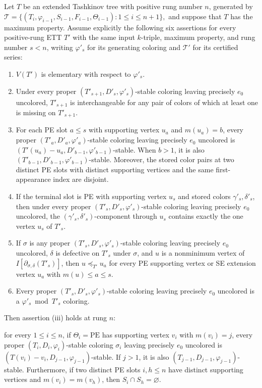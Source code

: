 \begin{lemma}
Let \(T\) be an extended Tashkinov tree with positive rung number \(n\),
generated by
\(
\mathcal T=\{(T_i,\varphi_{i-1},S_{i-1},F_{i-1},\Theta_{i-1}):
1\leq i\leq n+1\},
\)
and suppose that \(T\) has the maximum property.  Assume explicitly the
following six assertions for every positive-rung ETT \(T'\) with the same
input \(k\)-triple, maximum property, and rung number \(s<n\), writing
\(\varphi'_s\) for its generating coloring and \(\mathcal T'\) for its
certified series:
\begin{enumerate}
\item \(V(T')\) is elementary with respect to \(\varphi'_s\).
\item Under every proper \((T'_{s+1},D'_s,\varphi'_s)\)-stable coloring
leaving precisely \(e_0\) uncolored, \(T'_{s+1}\) is interchangeable for
any pair of colors of which at least one is missing on \(T'_{s+1}\).
\item For each PE slot \(a\leq s\) with supporting vertex \(u_a\) and
\(m(u_a)=b\), every proper \((T'_a,D'_a,\varphi'_a)\)-stable coloring
leaving precisely \(e_0\) uncolored is
\((T'(u_a)-u_a,D'_{b-1},\varphi'_{b-1})\)-stable.  When \(b>1\), it is
also \((T'_{b-1},D'_{b-1},\varphi'_{b-1})\)-stable.  Moreover, the stored
color pairs at two distinct PE slots with distinct supporting vertices
and the same first-appearance index are disjoint.
\item If the terminal slot is PE with supporting vertex \(u_s\) and
stored colors \(\gamma'_s,\delta'_s\), then under every proper
\((T'_s,D'_s,\varphi'_s)\)-stable coloring leaving precisely \(e_0\)
uncolored, the \((\gamma'_s,\delta'_s)\)-component through \(u_s\)
contains exactly the one vertex \(u_s\) of \(T'_s\).
\item If \(\sigma\) is any proper \((T'_s,D'_s,\varphi'_s)\)-stable
coloring leaving precisely \(e_0\) uncolored, \(\delta\) is defective on
\(T'_s\) under \(\sigma\), and \(u\) is a nonminimum vertex of
\(I[\partial_{\sigma,\delta}(T'_s)]\), then
\(u\preceq_{T'}u_a\) for every PE supporting vertex or SE extension
vertex \(u_a\) with \(m(u)\leq a\leq s\).
\item Every proper \((T'_s,D'_s,\varphi'_s)\)-stable coloring leaving
precisely \(e_0\) uncolored is a \(\varphi'_s\bmod T'_s\) coloring.
\end{enumerate}
Then assertion (iii) holds at rung \(n\):

for every \(1\leq i\leq n\), if \(\Theta_i=\mathrm{PE}\) has supporting
vertex \(v_i\) with \(m(v_i)=j\), every proper
\((T_i,D_i,\varphi_i)\)-stable coloring \(\sigma_i\) leaving precisely
\(e_0\) uncolored is
\((T(v_i)-v_i,D_{j-1},\varphi_{j-1})\)-stable.  If \(j>1\), it is also
\((T_{j-1},D_{j-1},\varphi_{j-1})\)-stable.
Furthermore, if two distinct PE slots \(i,h\leq n\) have distinct
supporting vertices and \(m(v_i)=m(v_h)\), then
\(S_i\cap S_h=\varnothing\).
\end{lemma}

